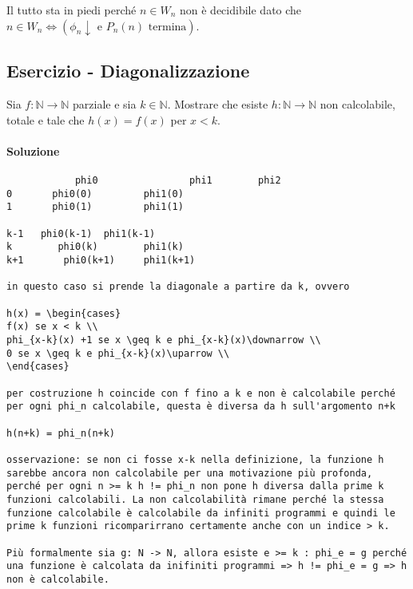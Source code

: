 Il tutto sta in piedi perché $ n \in W_n $ non è decidibile dato che $ n \in W_n \Leftrightarrow (\phi_n \downarrow \text{ e } P_n(n) \text{ termina}) $.

\subsection{Esercizio - Diagonalizzazione}

Sia $ f : \mathbb{N} \rightarrow \mathbb{N} $ parziale e sia $ k \in \mathbb{N} $. Mostrare che esiste $ h : \mathbb{N} \rightarrow \mathbb{N} $ non calcolabile, totale e tale che $ h(x) = f(x) $ per $ x < k $.

\paragraph{Soluzione}

\begin{verbatim}
			phi0 				phi1		phi2
0		phi0(0)			phi1(0)
1       phi0(1)         phi1(1)

k-1   phi0(k-1)  phi1(k-1)
k        phi0(k)		phi1(k)
k+1       phi0(k+1)		phi1(k+1)

in questo caso si prende la diagonale a partire da k, ovvero

h(x) = \begin{cases}
f(x) se x < k \\
phi_{x-k}(x) +1 se x \geq k e phi_{x-k}(x)\downarrow \\
0 se x \geq k e phi_{x-k}(x)\uparrow \\
\end{cases}

per costruzione h coincide con f fino a k e non è calcolabile perché per ogni phi_n calcolabile, questa è diversa da h sull'argomento n+k

h(n+k) = phi_n(n+k)

osservazione: se non ci fosse x-k nella definizione, la funzione h sarebbe ancora non calcolabile per una motivazione più profonda, perché per ogni n >= k h != phi_n non pone h diversa dalla prime k funzioni calcolabili. La non calcolabilità rimane perché la stessa funzione calcolabile è calcolabile da infiniti programmi e quindi le prime k funzioni ricomparirrano certamente anche con un indice > k.

Più formalmente sia g: N -> N, allora esiste e >= k : phi_e = g perché una funzione è calcolata da inifiniti programmi => h != phi_e = g => h non è calcolabile.
\end{verbatim}

